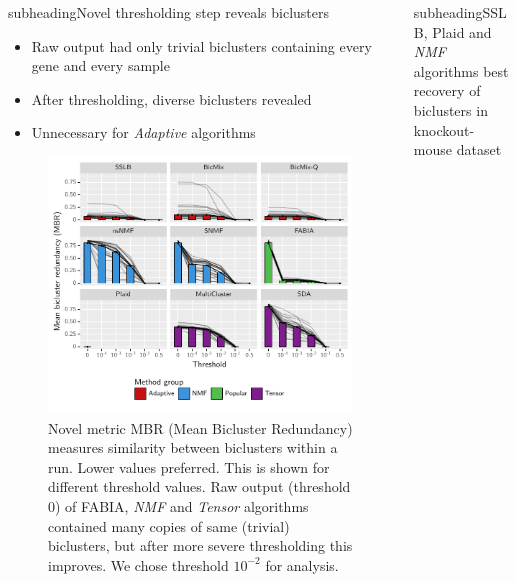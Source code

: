 \documentclass[xcolor=table,final]{beamer}
\newlength{\onecolwid}
\newlength{\twocolwid}
\newcommand{\kcnsubheading}[1]{\begin{beamercolorbox}[rounded=true]{subheading}{\large #1}\end{beamercolorbox}}
\begin{document}
\begin{frame}[t]
\begin{columns}[t]
\begin{column}{\twocolwid}
\begin{columns}
\begin{column}{\onecolwid}
\kcnsubheading{Novel thresholding step reveals biclusters}

\begin{itemize}
    \item Raw output had only trivial biclusters containing every gene and every sample
    \item After thresholding, diverse biclusters revealed
    \item Unnecessary for \textit{Adaptive} algorithms
\end{itemize}

\begin{figure}
\includegraphics[width=0.9 \textwidth]{plots/threshold_adjusted_redundancy_mean_lines.pdf}
\caption{Novel metric MBR (Mean Bicluster Redundancy) measures similarity between biclusters within a run. Lower values preferred. This is shown for different threshold values. Raw output (threshold 0) of FABIA, \textit{NMF} and \textit{Tensor} algorithms contained many copies of same (trivial) biclusters, but after more severe thresholding this improves. We chose threshold $10^{-2}$ for analysis.}
\end{figure}

\end{column} %

\begin{column}{\onecolwid} %


\kcnsubheading{SSLB, Plaid and \textit{NMF} algorithms best recovery of biclusters in knockout-mouse dataset}


\end{column}
\end{columns}
\end{column}
\end{columns}
\end{frame}
\end{document}

